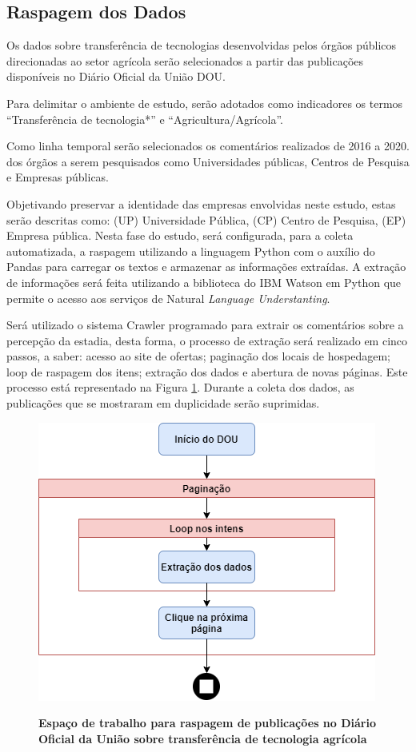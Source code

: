 \subsection{Raspagem dos Dados}

Os dados sobre transferência de tecnologias desenvolvidas pelos órgãos públicos direcionadas ao setor agrícola serão selecionados a partir das publicações disponíveis no Diário Oficial da União DOU.

Para delimitar o ambiente de estudo, serão adotados como indicadores os termos “Transferência de tecnologia*” e “Agricultura/Agrícola”. 

Como linha temporal serão selecionados os comentários realizados de 2016 a 2020. dos órgãos a serem pesquisados como Universidades públicas, Centros de Pesquisa e Empresas públicas.

Objetivando preservar a identidade das empresas envolvidas neste estudo, estas serão descritas como: (UP) Universidade Pública, (CP) Centro de Pesquisa, (EP) Empresa pública. Nesta fase do  estudo, será configurada, para a coleta automatizada, a raspagem utilizando a linguagem Python com o auxílio do Pandas para carregar os textos e armazenar as informações extraídas. A extração de informações será feita utilizando a biblioteca do IBM Watson em Python que permite o acesso aos serviços de Natural \textit{Language Understanting}.

Será utilizado o sistema Crawler programado para extrair os comentários sobre a percepção da estadia, desta forma, o processo de extração será realizado em cinco passos, a saber: acesso ao site de ofertas; paginação dos locais de hospedagem; loop de raspagem dos itens; extração dos dados e abertura de novas páginas. Este processo está representado  na Figura \ref{figura_raspagem}. Durante a coleta dos dados, as publicações que se mostraram em duplicidade serão suprimidas. 



\begin{figure}[H]
\centering
\caption{\textbf{Espaço de trabalho para raspagem de publicações no Diário Oficial da União sobre transferência de tecnologia agrícola}}
\includegraphics[scale=0.6]{Imagens/raspagem.png}
\label{figura_raspagem}
\end{figure}


